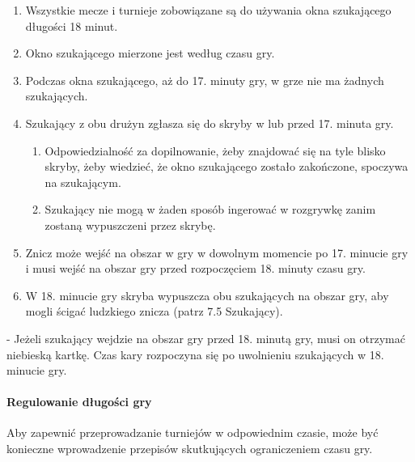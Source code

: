 \documentclass[12pt]{article}
\newcommand\bluecard{\bgroup\color{blue}\markoverwith{\textcolor{blue}{\rule[-0.5ex]{2pt}{0.4pt}}}\ULon}
\begin{document}
\begin{enumerate}
	\item Wszystkie mecze i turnieje zobowiązane są do używania okna
	      szukającego długości 18 minut.

	\item Okno szukającego mierzone jest według czasu gry.

	\item Podczas okna szukającego, aż do 17. minuty gry, w grze nie ma żadnych
	      szukających.

	\item Szukający z obu drużyn zgłasza się do skryby w lub przed 17. minuta
	      gry.
	      \begin{enumerate}
		      \item Odpowiedzialność za dopilnowanie, żeby znajdować się na tyle blisko
		            skryby, żeby wiedzieć, że okno szukającego zostało zakończone, spoczywa
		            na szukającym.

		      \item Szukający nie mogą w żaden sposób ingerować w rozgrywkę zanim
		            zostaną wypuszczeni przez skrybę.
	      \end{enumerate}

	\item Znicz może wejść na obszar w gry w dowolnym momencie po 17. minucie
	      gry i musi wejść na obszar gry przed rozpoczęciem 18. minuty czasu gry.

	\item W 18. minucie gry skryba wypuszcza obu szukających na obszar gry, aby
	      mogli ścigać ludzkiego znicza (patrz 7.5 Szukający).
\end{enumerate}

\bluecard{Niebieska kartka} - Jeżeli szukający wejdzie na obszar gry przed
18. minutą gry, musi on otrzymać niebieską kartkę. Czas kary rozpoczyna
się po uwolnieniu szukających w 18. minucie gry.

\paragraph{Regulowanie długości gry}
Aby zapewnić
przeprowadzanie turniejów w odpowiednim czasie, może być konieczne
wprowadzenie przepisów skutkujących ograniczeniem czasu gry.
\end{document}
